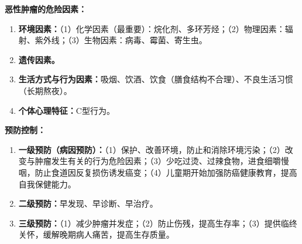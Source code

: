 \begin{keybox}
\textbf{恶性肿瘤的危险因素：}

\begin{enumerate}[leftmargin=*]
    \item \textbf{环境因素：}（1）化学因素（最重要）：烷化剂、多环芳烃；（2）物理因素：辐射、紫外线；（3）生物因素：病毒、霉菌、寄生虫。
    \item \textbf{遗传因素。}
    \item \textbf{生活方式与行为因素：}吸烟、饮酒、饮食（膳食结构不合理）、不良生活习惯（长期熬夜）。
    \item \textbf{个体心理特征：}C型行为。
\end{enumerate}

\textbf{预防控制：}

\begin{enumerate}[leftmargin=*]
    \item \textbf{一级预防（病因预防）：}（1）保护、改善环境，防止和消除环境污染；（2）改变与肿瘤发生有关的行为危险因素；（3）少吃过烫、过辣食物，进食细嚼慢咽，防止食道因反复损伤诱发癌变；（4）儿童期开始加强防癌健康教育，提高自我保健能力。
    \item \textbf{二级预防：}早发现、早诊断、早治疗。
    \item \textbf{三级预防：}（1）减少肿瘤并发症；（2）防止伤残，提高生存率；（3）提供临终关怀，缓解晚期病人痛苦，提高生存质量。
\end{enumerate}
\end{keybox}

